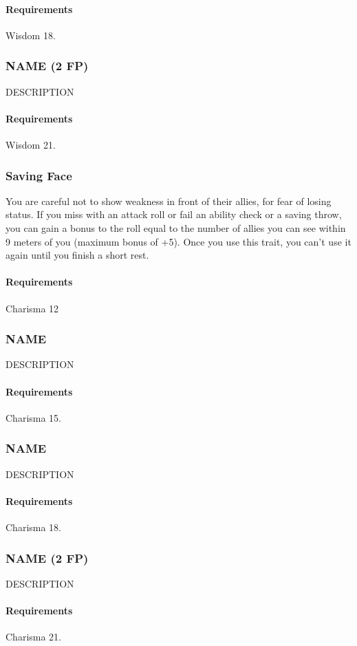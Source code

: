     \paragraph{Requirements} Wisdom 18.
\subsubsection{NAME (2 FP)} \label{feat::name}
    DESCRIPTION
    \paragraph{Requirements} Wisdom 21.
\subsubsection{Saving Face} \label{feat::savingface}
    You are careful not to show weakness in front of their allies, for fear of losing status.
    If you miss with an attack roll or fail an ability check or a saving throw, you can gain a bonus to the roll equal to the number of allies you can see within 9 meters of you (maximum bonus of +5).
    Once you use this trait, you can't use it again until you finish a short rest.
    \paragraph{Requirements} Charisma 12
\subsubsection{NAME} \label{feat::name}
    DESCRIPTION
    \paragraph{Requirements} Charisma 15.
\subsubsection{NAME} \label{feat::name}
    DESCRIPTION
    \paragraph{Requirements} Charisma 18.
\subsubsection{NAME (2 FP)} \label{feat::name}
    DESCRIPTION
    \paragraph{Requirements} Charisma 21.
